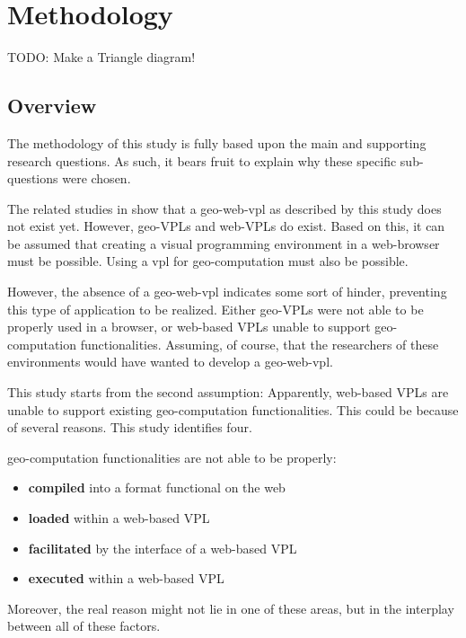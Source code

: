 \chapter{Methodology}
\label{chap:methodology}

\begin{note}
TODO: Make a Triangle diagram!
\end{note}

\section*{Overview}
\label{sec:method-overview}

The methodology of this study is fully based upon the main and supporting research questions. 
As such, it bears fruit to explain why these specific sub-questions were chosen. 

The related studies in  show that a \ac{geo-web-vpl} as described by this study does not exist yet. However, geo-VPLs and web-VPLs do exist. 
Based on this, it can be assumed that creating a visual programming environment in a web-browser must be possible. 
Using a \ac*{vpl} for geo-computation must also be possible. 

However, the absence of a geo-web-vpl indicates some sort of hinder, preventing this type of application to be realized. Either geo-VPLs were not able to be properly used in a browser, or web-based VPLs unable to support geo-computation functionalities. 
Assuming, of course, that the researchers of these environments would have wanted to develop a \ac{geo-web-vpl}.

This study starts from the second assumption: 
Apparently, web-based VPLs are unable to support existing geo-computation functionalities. 
This could be because of several reasons. 
This study identifies four.

geo-computation functionalities are not able to be properly:
\begin{itemize}[-]
  \item \textbf{compiled} into a format functional on the web
  \item \textbf{loaded} within a web-based VPL
  \item \textbf{facilitated} by the interface of a web-based VPL
  \item \textbf{executed} within a web-based VPL
\end{itemize}
Moreover, the real reason might not lie in one of these areas, but in the interplay between all of these factors. 

